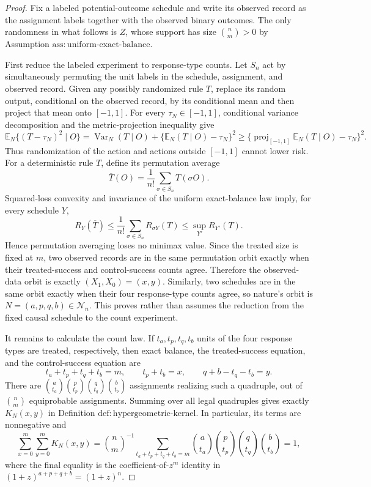 \documentclass{article}
\begin{document}
\begin{proof}
Fix a labeled potential-outcome schedule and write its observed record as the assignment labels together with the observed binary outcomes.  The only randomness in what follows is \(Z\), whose support has size \(\binom n m>0\) by Assumption \(\mathrm{ass{:}uniform\mbox{-}exact\mbox{-}balance}\).

First reduce the labeled experiment to response-type counts.  Let \(S_n\) act by simultaneously permuting the unit labels in the schedule, assignment, and observed record.  Given any possibly randomized rule \(T\), replace its random output, conditional on the observed record, by its conditional mean and then project that mean onto \([-1,1]\).  For every \(\tau_N\in[-1,1]\), conditional variance decomposition and the metric-projection inequality give
\[
 \mathbb E_N\{(T-\tau_N)^2\mid O\}
 =\operatorname{Var}_N(T\mid O)+\{\mathbb E_N(T\mid O)-\tau_N\}^2
 \geq \{\operatorname{proj}_{[-1,1]}\mathbb E_N(T\mid O)-\tau_N\}^2.
\]
Thus randomization of the action and actions outside \([-1,1]\) cannot lower risk.  For a deterministic rule \(T\), define its permutation average
\[
 \overline T(O)=\frac1{n!}\sum_{\sigma\in S_n}T(\sigma O).
\]
Squared-loss convexity and invariance of the uniform exact-balance law imply, for every schedule \(Y\),
\[
 R_Y(\overline T)
 \leq \frac1{n!}\sum_{\sigma\in S_n}R_{\sigma Y}(T)
 \leq \sup_{Y'}R_{Y'}(T).
\]
Hence permutation averaging loses no minimax value.  Since the treated size is fixed at \(m\), two observed records are in the same permutation orbit exactly when their treated-success and control-success counts agree.  Therefore the observed-data orbit is exactly \((X_1,X_0)=(x,y)\).  Similarly, two schedules are in the same orbit exactly when their four response-type counts agree, so nature's orbit is \(N=(a,p,q,b)\in\mathcal N_n\).  This proves rather than assumes the reduction from the fixed causal schedule to the count experiment.

It remains to calculate the count law.  If \(t_a,t_p,t_q,t_b\) units of the four response types are treated, respectively, then exact balance, the treated-success equation, and the control-success equation are
\[
 t_a+t_p+t_q+t_b=m,\qquad t_p+t_b=x,\qquad q+b-t_q-t_b=y.
\]
There are
\(
 \binom a{t_a}\binom p{t_p}\binom q{t_q}\binom b{t_b}
\)
assignments realizing such a quadruple, out of \(\binom n m\) equiprobable assignments.  Summing over all legal quadruples gives exactly \(K_N(x,y)\) in Definition \(\mathrm{def{:}hypergeometric\mbox{-}kernel}\).  In particular, its terms are nonnegative and
\[
 \sum_{x=0}^m\sum_{y=0}^mK_N(x,y)
 =\binom n m^{-1}\sum_{t_a+t_p+t_q+t_b=m}
   \binom a{t_a}\binom p{t_p}\binom q{t_q}\binom b{t_b}=1,
\]
where the final equality is the coefficient-of-\(z^m\) identity in
\((1+z)^{a+p+q+b}=(1+z)^n\).


\end{proof}
\end{document}
